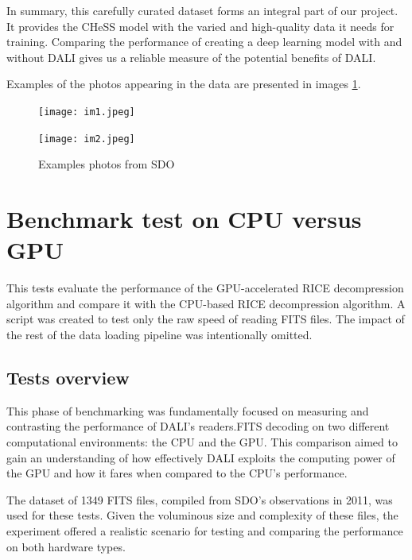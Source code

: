 \documentclass[licencjacka,en]{pracamgr}
\begin{document}
In summary, this carefully curated dataset forms an integral part of our project. It provides the CHeSS model with the varied and high-quality data it needs for training. 
Comparing the performance of creating a deep learning model with and without DALI gives us a reliable measure of the potential benefits of DALI.

Examples of the photos appearing in the data are presented in images \ref{fits_photo}. 

\begin{figure}[htbp]
    \vspace{1cm} %
    \centering
    \begin{minipage}{.45\textwidth}
        \centering
        \texttt{[image: im1.jpeg]}
    \end{minipage}\hfill
    \begin{minipage}{.45\textwidth}
        \centering
        \texttt{[image: im2.jpeg]}
    \end{minipage}
    \caption{Examples photos from SDO \cite{sdo}}
    \label{fits_photo}
\end{figure}


\section{\label{benchmark}Benchmark test on CPU versus GPU}
This tests evaluate the performance of the GPU-accelerated RICE decompression algorithm and compare it with the CPU-based RICE decompression algorithm. A script was created to test only the raw speed of reading FITS files. The impact of the rest of the data loading pipeline was intentionally omitted. 

\subsection{Tests overview}
This phase of benchmarking was fundamentally focused on measuring and contrasting the performance of DALI's readers.FITS decoding on two different computational environments: the CPU and the GPU. This comparison aimed to gain an understanding of how effectively DALI exploits the computing power of the GPU and how it fares when compared to the CPU's performance.

The dataset \cite{sdo} of 1349 FITS files, compiled from SDO's observations in 2011, was used for these tests. Given the voluminous size and complexity of these files, the experiment offered a realistic scenario for testing and comparing the performance on both hardware types.
\end{document}
